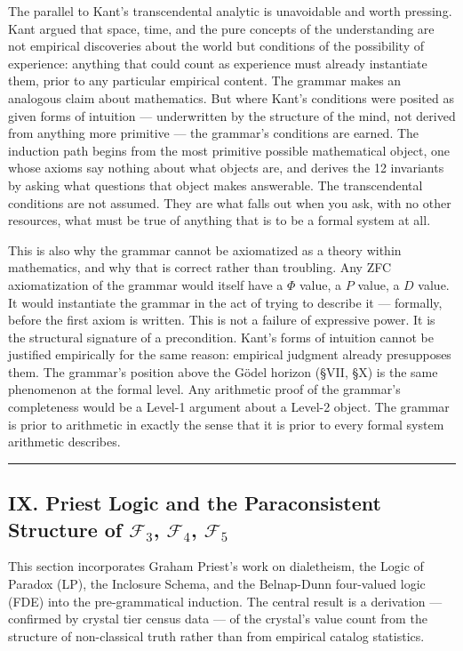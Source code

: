 \documentclass[12pt,a4paper]{article}
\newcommand{\pilcrow}{\S}
\begin{document}
The parallel to Kant's transcendental analytic is unavoidable and worth pressing. Kant argued that space, time, and the pure concepts of the understanding are not empirical discoveries about the world but conditions of the possibility of experience: anything that could count as experience must already instantiate them, prior to any particular empirical content. The grammar makes an analogous claim about mathematics. But where Kant's conditions were posited as given forms of intuition --- underwritten by the structure of the mind, not derived from anything more primitive --- the grammar's conditions are earned. The induction path begins from the most primitive possible mathematical object, one whose axioms say nothing about what objects are, and derives the 12 invariants by asking what questions that object makes answerable. The transcendental conditions are not assumed. They are what falls out when you ask, with no other resources, what must be true of anything that is to be a formal system at all.

This is also why the grammar cannot be axiomatized as a theory within mathematics, and why that is correct rather than troubling. Any ZFC axiomatization of the grammar would itself have a $\Phi$ value, a $P$ value, a $D$ value. It would instantiate the grammar in the act of trying to describe it --- formally, before the first axiom is written. This is not a failure of expressive power. It is the structural signature of a precondition. Kant's forms of intuition cannot be justified empirically for the same reason: empirical judgment already presupposes them. The grammar's position above the G\"odel horizon (\pilcrow{}VII, \pilcrow{}X) is the same phenomenon at the formal level. Any arithmetic proof of the grammar's completeness would be a Level-1 argument about a Level-2 object. The grammar is prior to arithmetic in exactly the sense that it is prior to every formal system arithmetic describes.\begin{center}
\rule{0.5\textwidth}{0.4pt}
\end{center}

\subsection{IX. Priest Logic and the Paraconsistent Structure of $\mathcal{F}_3$, $\mathcal{F}_4$, $\mathcal{F}_5$}

This section incorporates Graham Priest's work on dialetheism, the Logic of Paradox (LP), the Inclosure Schema, and the Belnap-Dunn four-valued logic (FDE) into the pre-grammatical induction. The central result is a derivation --- confirmed by crystal tier census data --- of the crystal's value count from the structure of non-classical truth rather than from empirical catalog statistics.
\end{document}
